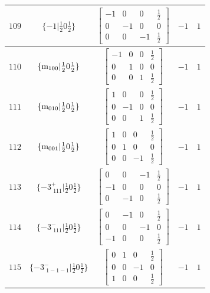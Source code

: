 \documentclass[fleqn,8pt]{jsarticle}
\begin{document}
\begin{longtable}{ccccc}
$ 109 $ & $ \{-1|\frac{1}{2} 0 \frac{1}{2}\} $ & $ \begin{bmatrix} -1 & 0 & 0 & \frac{1}{2} \\ 0 & -1 & 0 & 0 \\ 0 & 0 & -1 & \frac{1}{2} \end{bmatrix} $ & $ -1 $ & $ 1 $ \\ \hline
$ 110 $ & $ \{{\rm m}_{100}|\frac{1}{2} 0 \frac{1}{2}\} $ & $ \begin{bmatrix} -1 & 0 & 0 & \frac{1}{2} \\ 0 & 1 & 0 & 0 \\ 0 & 0 & 1 & \frac{1}{2} \end{bmatrix} $ & $ -1 $ & $ 1 $ \\ \hline
$ 111 $ & $ \{{\rm m}_{010}|\frac{1}{2} 0 \frac{1}{2}\} $ & $ \begin{bmatrix} 1 & 0 & 0 & \frac{1}{2} \\ 0 & -1 & 0 & 0 \\ 0 & 0 & 1 & \frac{1}{2} \end{bmatrix} $ & $ -1 $ & $ 1 $ \\ \hline
$ 112 $ & $ \{{\rm m}_{001}|\frac{1}{2} 0 \frac{1}{2}\} $ & $ \begin{bmatrix} 1 & 0 & 0 & \frac{1}{2} \\ 0 & 1 & 0 & 0 \\ 0 & 0 & -1 & \frac{1}{2} \end{bmatrix} $ & $ -1 $ & $ 1 $ \\ \hline
$ 113 $ & $ \{-3^{+}_{\,\,111}|\frac{1}{2} 0 \frac{1}{2}\} $ & $ \begin{bmatrix} 0 & 0 & -1 & \frac{1}{2} \\ -1 & 0 & 0 & 0 \\ 0 & -1 & 0 & \frac{1}{2} \end{bmatrix} $ & $ -1 $ & $ 1 $ \\ \hline
$ 114 $ & $ \{-3^{-}_{\,\,111}|\frac{1}{2} 0 \frac{1}{2}\} $ & $ \begin{bmatrix} 0 & -1 & 0 & \frac{1}{2} \\ 0 & 0 & -1 & 0 \\ -1 & 0 & 0 & \frac{1}{2} \end{bmatrix} $ & $ -1 $ & $ 1 $ \\ \hline
$ 115 $ & $ \{-3^{-}_{\,\,1-1-1}|\frac{1}{2} 0 \frac{1}{2}\} $ & $ \begin{bmatrix} 0 & 1 & 0 & \frac{1}{2} \\ 0 & 0 & -1 & 0 \\ 1 & 0 & 0 & \frac{1}{2} \end{bmatrix} $ & $ -1 $ & $ 1 $ \\ \hline

\end{longtable}
\end{document}
